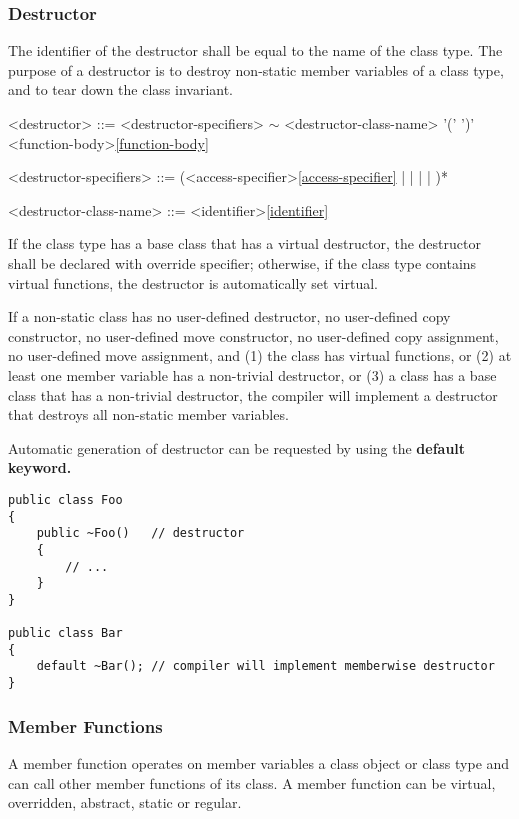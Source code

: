 \documentclass[a4paper,oneside,11pt]{article}
\begin{document}
\subsubsection{Destructor}

The identifier of the destructor shall be equal to the name of the class type.
The purpose of a destructor is to destroy non-static member variables of a class type,
and to tear down the class invariant.

\begin{grammar}
\label{destructor}<destructor> ::= <destructor-specifiers> $\sim$ <destructor-class-name> '(' ')' <function-body>\ref{function-body}

<destructor-specifiers> ::= (<access-specifier>\ref{access-specifier} |  |  |  | )*

<destructor-class-name> ::= <identifier>\ref{identifier}
\end{grammar}

If the class type has a base class that has a virtual destructor, the destructor shall be declared with override specifier;
otherwise, if the class type contains virtual functions, the destructor is automatically set virtual.

If a non-static class has no user-defined destructor,
no user-defined copy constructor, no user-defined move constructor, no user-defined copy assignment, no user-defined move assignment, and
(1) the class has virtual functions,
or (2) at least one member variable has a non-trivial destructor,
or (3) a class has a base class that has a non-trivial destructor,
the compiler will implement a destructor that destroys all non-static member variables.

Automatic generation of destructor can be requested by using the \bf{default} keyword.

\begin{lstlisting}[frame=trBL]
public class Foo
{
    public ~Foo()   // destructor
    {
        // ...
    }
}

public class Bar
{
    default ~Bar(); // compiler will implement memberwise destructor
}
\end{lstlisting}

\subsubsection{Member Functions}

A member function operates on member variables a class object or class type and can call
other member functions of its class.
A member function can be virtual, overridden, abstract, static or regular.
\end{document}

